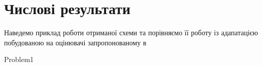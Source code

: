 
\section{Числові результати}

Наведемо приклад роботи отриманої схеми та порівняємо
	її роботу із адапатацією побудованою на оцінювачі запропонованому в 

{Problem1}
